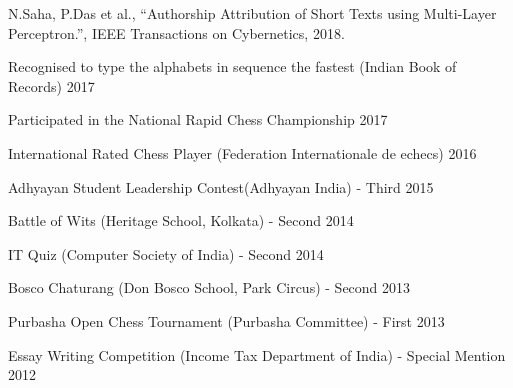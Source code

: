 \documentclass[10pt, letterpaper]{deps1}
\begin{document}
\small{\begin{tightitemize}
    \item N.Saha, P.Das et al., ``Authorship Attribution of Short Texts using Multi-Layer Perceptron.'', IEEE Transactions on \mbox{Cybernetics}, 2018.
\end{tightitemize}}

\vspace{5pt}
\begin{tightitemize}
	\item Recognised to type the alphabets in sequence the fastest (Indian Book of Records) \hfill{2017}
	\item Participated in the National Rapid Chess Championship \hfill{2017}
	\item International Rated Chess Player (Federation Internationale de echecs) \hfill{2016}
	\item Adhyayan Student Leadership Contest(Adhyayan India) - Third \hfill{2015}
	\item Battle of Wits (Heritage School, Kolkata) - Second \hfill{2014}
	\item IT Quiz (Computer Society of India) - Second \hfill{2014}
	\item Bosco Chaturang (Don Bosco School, Park Circus) - Second \hfill{2013}
	\item Purbasha Open Chess Tournament (Purbasha Committee) - First \hfill{2013}
	\item Essay Writing Competition (Income Tax Department of India) - Special Mention \hfill{2012}
\end{tightitemize}
\end{document}
